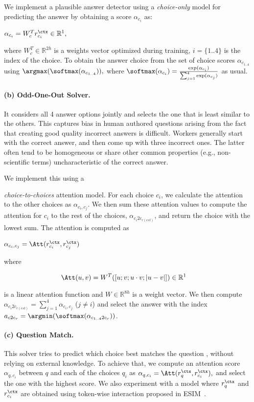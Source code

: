 We implement a plausible answer detector using a \textit{choice-only} model for predicting the answer by obtaining a score $\alpha_{c_i}$ as:

$\alpha_{c_i} = W^T_{c}r^{\ctx}_{c_i} \in \mathbb{R}^{1},$

where $ W^T_{c}  \in \mathbb{R}^{2h}$ is a weights vector optimized during training, $i=\{1..4\}$ is the index of the choice. To obtain the answer choice from the set of choice scores $\alpha_{c_{1..4}}$ 
using
$\argmax(\softmax(\alpha_{c_{1..4}})),$
where
$\softmax(\alpha_{c_{i}}) = \frac{\exp(\alpha_{c_{i}})}{\sum_{j=1}^{4}{\exp(\alpha_{c_{j}})}}$ as usual. 

\paragraph{(b) Odd-One-Out Solver.} It considers all 4 answer options jointly and selects the one that is least similar to the others. This captures bias in human authored questions arising from the fact that creating good quality incorrect answers is difficult. Workers generally start with the correct answer, and then come up with three incorrect ones. The latter often tend to be homogeneous or share other common properties (e.g., non-scientific terms) uncharacteristic of the correct answer.

We implement this using a 

\textit{choice-to-choices}
attention model. For each choice $c_i$, we calculate the attention to the other choices as $\alpha_{c_i,c_j}$. We then sum these attention values to compute the attention for $c_i$ to the rest of the choices, $\alpha_{c_{i}2c_{r(est)}}$, and return the choice with the lowest sum.  The attention is computed as  

$\alpha_{c_i, c_j} = \Att(r^{\ctx}_{c_i}, r^{\ctx}_{c_j})$

where

\begin{align*}
\Att(u, v) & = W^T([u; v; u \cdot v ; |u - v|]) \in \mathbb{R}^{1}
\end{align*}

is a linear attention function and $W \in \mathbb{R}^{8h}$ is a weight vector. We then compute $\alpha_{c_{i}2c_{r(est)}} = \sum_{j=1}^{4}{\alpha_{c_i,c_j}}$ ($j \neq i$) and select the answer with the index $a_{c2c_{r}} = \argmin(\softmax(\alpha_{c_{1..4}2c_{r}}))$.

\paragraph{(c) Question Match.} This solver tries to predict which choice best matches the question \cite{cqa-semeval-2016}, without relying on external knowledge. To achieve that, we compute an attention score $\alpha_{q, c_i}$ between $q$ and each of the choices $q_i$ as
$\alpha_{q, c_i} = \Att(r^{\ctx}_q, r^{\ctx}_{c_i}),$
and select the one with the highest score. We also experiment with a model where $r^{\ctx}_q$ and $r^{\ctx}_{c_i}$ are obtained using token-wise interaction proposed in ESIM~\cite{esim-chen2017}.

